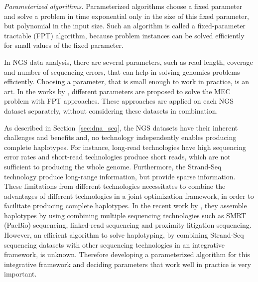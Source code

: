 \textit{Parameterized algorithms.} 
Parameterized algorithms choose a fixed parameter and solve a problem in time exponential only in the size of this fixed parameter, but polynomial in the input size. 
Such an algorithm is called a fixed-parameter tractable (FPT) algorithm, because problem instances can be solved efficiently for small values of the fixed parameter.

In NGS data analysis, there are several parameters, such as read length, coverage and number of sequencing errors, that can help in solving genomics problems efficiently. 
Choosing a parameter, that is small enough to work in practice, is an art.
In the works by \cite{he2010optimal,Patterson2015,Pirola2015, martin2016whatshap, klau2017guided}, different parameters are proposed to solve the MEC problem with FPT approaches.
These approaches are applied on each NGS dataset separately, without considering these datasets in combination.

As described in Section~\ref{sec:dna_seq}, the NGS datasets have their inherent challenges and benefits and, no technology independently enables producing complete haplotypes.
For instance, long-read technologies have high sequencing error rates and short-read technologies produce short reads, which are not sufficient to producing the whole genome.
Furthermore, the Strand-Seq technology produce long-range information, but provide sparse information.
These limitations from different technologies necessitates to combine the advantages of different technologies in a joint optimization framework, in order to facilitate producing complete haplotypes. 
In the recent work by \cite{edge2017hapcut2}, they assemble haplotypes by using combining multiple sequencing technologies such as SMRT (PacBio) sequencing, linked-read sequencing and proximity
litigation sequencing.
However, an efficient algorithm to solve haplotyping, by combining Strand-Seq sequencing datasets with other sequencing technologies in an integrative framework, is unknown.
Therefore developing a parameterized algorithm for this integrative framework and deciding parameters that work well in practice is very important.

